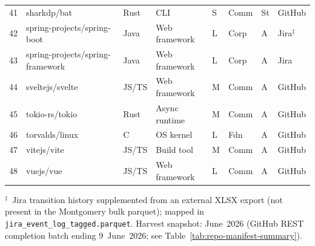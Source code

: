 \begin{landscape}
\begin{longtable}{clllllll}
41  & sharkdp/bat                  & Rust   & CLI                & S & Comm & St & GitHub \\
42  & spring-projects/spring-boot  & Java   & Web framework      & L & Corp & A  & Jira$^{\ddagger}$ \\
43  & spring-projects/spring-framework & Java & Web framework  & L & Corp & A  & Jira \\
44  & sveltejs/svelte              & JS/TS  & Web framework      & M & Comm & A  & GitHub \\
45  & tokio-rs/tokio               & Rust   & Async runtime      & M & Comm & A  & GitHub \\
46  & torvalds/linux               & C      & OS kernel          & L & Fdn  & A  & GitHub \\
47  & vitejs/vite                  & JS/TS  & Build tool         & M & Comm & A  & GitHub \\
48  & vuejs/vue                    & JS/TS  & Web framework      & L & Comm & A  & GitHub \\

\end{longtable}

\vspace{0.5em}
\noindent\footnotesize
$^{\ddagger}$~Jira transition history supplemented from an external XLSX export
(not present in the Montgomery bulk parquet); mapped in
\texttt{jira\_event\_log\_tagged.parquet}.
Harvest snapshot: June~2026 (GitHub REST completion batch ending 9~June~2026;
see Table~\ref{tab:repo-manifest-summary}).
\end{landscape}
